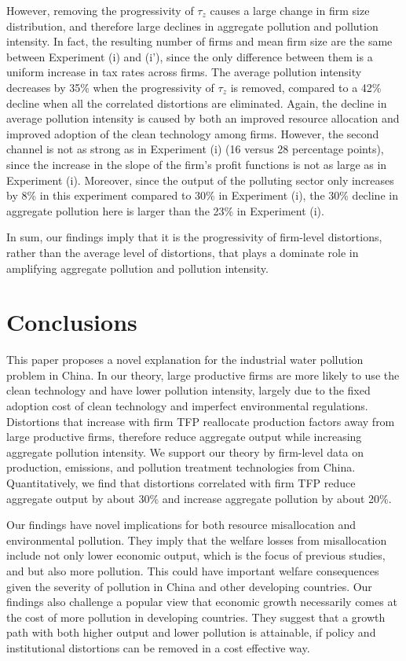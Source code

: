 \documentclass[AEJ]{AEA}
\begin{document}
However, removing the progressivity of $\tau_z$ causes a large change in firm size distribution, and therefore large declines in aggregate pollution and pollution intensity. In fact, the resulting number of firms and mean firm size are the same between Experiment (i) and (i'), since the only difference between them is a uniform increase in tax rates across firms. The average pollution intensity decreases by 35\% when the progressivity of $\tau_z$ is removed, compared to a 42\% decline when all the correlated distortions are eliminated. Again, the decline in average pollution intensity is caused by both an improved resource allocation and improved adoption of the clean technology among firms. However, the second channel is not as strong as in Experiment (i) (16 versus 28 percentage points), since the increase in the slope of the firm's profit functions is not as large as in Experiment (i). Moreover, since the output of the polluting sector only increases by 8\% in this experiment compared to 30\% in Experiment (i), the 30\% decline in aggregate pollution here is larger than the 23\% in Experiment (i).

In sum, our findings imply that it is the progressivity of firm-level distortions, rather than the average level of distortions, that plays a dominate role in amplifying aggregate pollution and pollution intensity.

\section{Conclusions}

This paper proposes a novel explanation for the industrial water pollution problem in China. In our theory, large productive firms are more likely to use the clean technology and have lower pollution intensity, largely due to the fixed adoption cost of clean technology and imperfect environmental regulations. Distortions that increase with firm TFP reallocate production factors away from large productive firms, therefore reduce aggregate output while increasing aggregate pollution intensity. We support our theory by firm-level data on production, emissions, and pollution treatment technologies from China. Quantitatively, we find that distortions correlated with firm TFP reduce aggregate output by about 30\% and increase aggregate pollution by about 20\%.

Our findings have novel implications for both resource misallocation and environmental pollution. They imply that the welfare losses from misallocation include not only lower economic output, which is the focus of previous studies, and but also more pollution. This could have important welfare consequences given the severity of pollution in China and other developing countries. Our findings also challenge a popular view that economic growth necessarily comes at the cost of more pollution in developing countries. They suggest that a growth path with both higher output and lower pollution is attainable, if policy and institutional distortions can be removed in a cost effective way.
\end{document}
